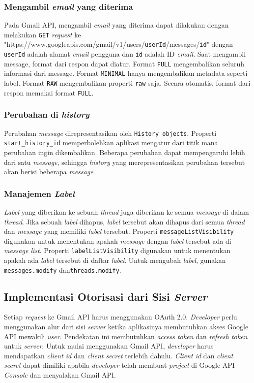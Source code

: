 \subsubsection{Mengambil \textit{email} yang diterima}
Pada Gmail API, mengambil \textit{email} yang diterima dapat dilakukan dengan melakukan \texttt{GET} \textit{request} ke "https://www.googleapis.com/gmail/v1/users/\texttt{userId}/messages/\texttt{id}" dengan \texttt{userId} adalah alamat \textit{email} pengguna dan \texttt{id} adalah ID \textit{email}. Saat mengambil message, format dari respon dapat diatur. Format \texttt{FULL} mengembalikan seluruh informasi dari message. Format \texttt{MINIMAL} hanya mengembalikan metadata seperti label. Format \texttt{RAW} mengembalikan properti \texttt{raw} saja. Secara otomatis, format dari respon memakai format \texttt{FULL}.

\subsubsection{Perubahan di \textit{history}}
Perubahan \textit{message} direpresentasikan oleh \texttt{History objects}. Properti \texttt{start\_history\_id} memperbolehkan aplikasi mengatur dari titik mana perubahan ingin dikembalikan. Beberapa perubahan dapat mempengaruhi lebih dari satu \textit{message}, sehingga \textit{history} yang merepresentasikan perubahan tersebut akan berisi beberapa \textit{message}.

\subsubsection{Manajemen \textit{Label}}
\textit{Label} yang diberikan ke sebuah \textit{thread} juga diberikan ke semua \textit{message} di dalam \textit{thread}. Jika sebuah \textit{label} dihapus, \textit{label} tersebut akan dihapus dari semua \textit{thread} dan \textit{message} yang memiliki \textit{label} tersebut. Properti \texttt{messageListVisibility} digunakan untuk menentukan apakah \textit{message} dengan \textit{label} tersebut ada di \textit{message list}. Properti \texttt{labelListVisibility} digunakan untuk menentukan apakah ada \textit{label} tersebut di daftar \textit{label}. Untuk mengubah \textit{label}, gunakan \texttt{messages.modify} dan\texttt{threads.modify}.

\subsection{Implementasi Otorisasi dari Sisi \textit{Server}}
Setiap \textit{request} ke Gmail API harus menggunakan OAuth 2.0. \textit{Developer} perlu menggunakan alur dari sisi \textit{server} ketika aplikasinya membutuhkan akses Google API mewakili \textit{user}. Pendekatan ini membutuhkan \textit{access token} dan \textit{refresh token} untuk \textit{server}. Untuk mulai menggunakan Gmail API, \textit{developer} harus mendapatkan \textit{client id} dan \textit{client secret} terlebih dahulu. \textit{Client id} dan \textit{client secret} dapat dimiliki apabila \textit{developer} telah membuat \textit{project} di Google API \textit{Console} dan menyalakan Gmail API.

